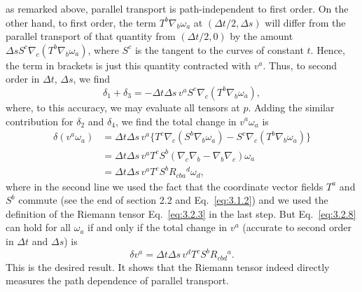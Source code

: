 as remarked above, parallel transport is path-independent to first order. On the other
hand, to first order, the term $T^b\nabla_b\omega_a$ at $(\Delta t/2,\Delta s)$ will differ from the parallel
transport of that quantity from $(\Delta t/2,0)$ by the amount
$\Delta sS^c\nabla_c(T^b\nabla_b\omega_a)$, where $S^c$ is the tangent to the curves of constant $t$. Hence, the term in
brackets is just this quantity contracted with $v^a$. Thus, to second order in $\Delta t$, $\Delta s$, we find
\begin{equation}
  \delta_1+\delta_3=-\Delta t\Delta s\,v^aS^c\nabla_c(T^b\nabla_b\omega_a),
  \tag{3.2.7}\label{eq:3.2.7}
\end{equation}
where, to this accuracy, we may evaluate all tensors at $p$. Adding the similar
contribution for $\delta_2$ and $\delta_4$, we find the total change in $v^a\omega_a$ is
\begin{equation}
  \begin{aligned}
    \delta(v^a\omega_a)
    &={}\Delta t\Delta s\,v^a\bigl\{T^c\nabla_c(S^b\nabla_b\omega_a)
      -S^c\nabla_c(T^b\nabla_b\omega_a)\bigr\}\\
    &={}\Delta t\Delta s\,v^aT^cS^b(\nabla_c\nabla_b-\nabla_b\nabla_c)\omega_a\\
    &={}\Delta t\Delta s\,v^aT^cS^bR_{cba}{}^d\omega_d,
  \end{aligned}
  \tag{3.2.8}\label{eq:3.2.8}
\end{equation}
where in the second line we used the fact that the coordinate vector fields $T^a$ and $S^b$
commute (see the end of section 2.2 and Eq.~\eqref{eq:3.1.2}) and we used the definition of
the Riemann tensor Eq.~\eqref{eq:3.2.3} in the last step. But Eq.~\eqref{eq:3.2.8} can hold
for all $\omega_a$ if and only if the total change in $v^a$ (accurate to second order in $\Delta t$ and $\Delta s$)
is
\begin{equation}
  \delta v^a=\Delta t\Delta s\,v^dT^cS^bR_{cbd}{}^a.
  \tag{3.2.9}\label{eq:3.2.9}
\end{equation}
This is the desired result. It shows that the Riemann tensor indeed directly measures
the path dependence of parallel transport.

